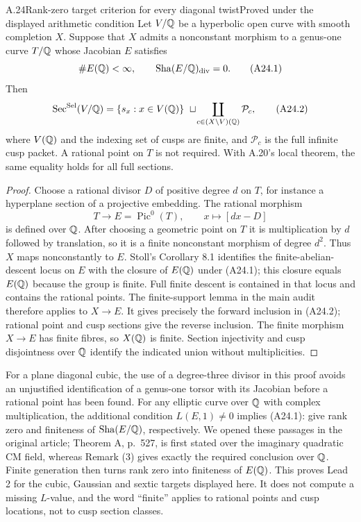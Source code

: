 \begin{statement}{A.24}{Rank-zero target criterion for every diagonal twist}{Proved under the displayed arithmetic condition}
Let $V/\mathbb Q$ be a hyperbolic open curve with smooth completion $X$. Suppose that $X$ admits a nonconstant morphism to a genus-one curve $T/\mathbb Q$ whose Jacobian $E$ satisfies
\[
\#E(\mathbb Q)<\infty,\qquad \mathop{\mathrm{Sha}}(E/\mathbb Q)_{\mathrm{div}}=0.
\tag{A24.1}
\]
Then
\[
\operatorname{Sec}^{\mathrm{Sel}}(V/\mathbb Q)
=\{s_x:x\in V(\mathbb Q)\}\ \sqcup\!
\coprod_{c\in(X\setminus V)(\mathbb Q)}\mathcal P_c,
\tag{A24.2}
\]
where $V(\mathbb Q)$ and the indexing set of cusps are finite, and $\mathcal P_c$ is the full infinite cusp packet. A rational point on $T$ is not required. With A.20's local theorem, the same equality holds for all full sections.
\end{statement}
\begin{proof}
Choose a rational divisor $D$ of positive degree $d$ on $T$, for instance a hyperplane section of a projective embedding. The rational morphism
\[
T\longrightarrow E=\operatorname{Pic}^0(T),\qquad x\longmapsto[d x-D]
\]
is defined over $\mathbb Q$. After choosing a geometric point on $T$ it is multiplication by $d$ followed by translation, so it is a finite nonconstant morphism of degree $d^2$. Thus $X$ maps nonconstantly to $E$. Stoll's Corollary 8.1 identifies the finite-abelian-descent locus on $E$ with the closure of $E(\mathbb Q)$ under (A24.1); this closure equals $E(\mathbb Q)$ because the group is finite. Full finite descent is contained in that locus and contains the rational points. The finite-support lemma in the main audit therefore applies to $X\to E$. It gives precisely the forward inclusion in (A24.2); rational point and cusp sections give the reverse inclusion. The finite morphism $X\to E$ has finite fibres, so $X(\mathbb Q)$ is finite. Section injectivity and cusp disjointness over $\mathbb Q$ identify the indicated union without multiplicities.
\end{proof}

For a plane diagonal cubic, the use of a degree-three divisor in this proof avoids an unjustified identification of a genus-one torsor with its Jacobian before a rational point has been found. For any elliptic curve over $\mathbb Q$ with complex multiplication, the additional condition $L(E,1)\ne0$ implies (A24.1): \citet[Corollary C and Remark (3), p.~528]{AMRubin1987} give rank zero and finiteness of $\mathop{\mathrm{Sha}}(E/\mathbb Q)$, respectively. We opened these passages in the original article; Theorem A, p.~527, is first stated over the imaginary quadratic CM field, whereas Remark (3) gives exactly the required conclusion over $\mathbb Q$. Finite generation then turns rank zero into finiteness of $E(\mathbb Q)$. This proves Lead 2 for the cubic, Gaussian and sextic targets displayed here. It does not compute a missing $L$-value, and the word ``finite'' applies to rational points and cusp locations, not to cusp section classes.


